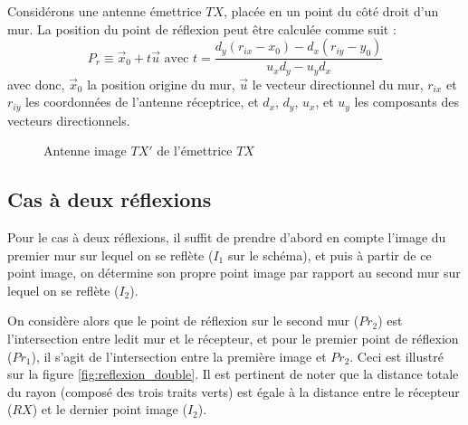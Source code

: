 Consid{\'e}rons une antenne {\'e}mettrice $TX$, plac{\'e}e en un point du
c{\^o}t{\'e} droit d'un mur. La position du point de réflexion peut être calculée comme suit :
\[ P_r \equiv \vec{x}_0 + t \vec{u} \text{  avec  } t = \frac{d_y  (r_{ix} - x_0) - d_x  (r_{iy} - y_0)}{u_x d_y - u_y d_x} \]
avec donc, $\vec{x}_0$ la position origine du mur, $\vec{u}$ le vecteur directionnel
du mur, $r_{ix}$ et $r_{iy}$ les coordonn{\'e}es de l'antenne
r{\'e}ceptrice, et $d_x$, $d_y$, $u_x$, et $u_y$ les composants des
vecteurs directionnels.


\begin{figure}[H]
    \centering
    \caption{Antenne image $TX'$ de l'émettrice $TX$}
    \label{fig:antenne_image}
\end{figure}
\subsection{Cas à deux réflexions}
Pour le cas à deux réflexions, il suffit de prendre d'abord en compte l'image du premier mur sur lequel on se reflète ($I_1$ sur le schéma), et puis à partir de ce point image, on détermine son propre point image par rapport au second mur sur lequel on se reflète ($I_2$). 

On considère alors que le point de réflexion sur le second mur ($Pr_2$) est l'intersection entre ledit mur et le récepteur, et pour le premier point de réflexion ($Pr_{1}$), il s'agit de l'intersection entre la première image et $Pr_{2}$. 
Ceci est illustré sur la figure  \ref{fig:reflexion_double}. Il est pertinent de noter que la distance totale du rayon (composé des trois traits verts) est égale à la distance entre le récepteur ($RX$) et le dernier point image ($I_2$).

